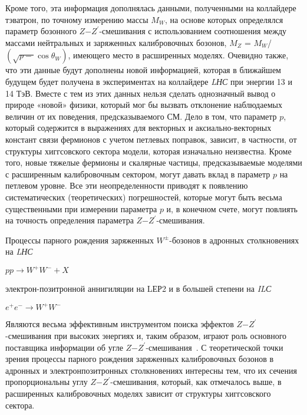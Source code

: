 Кроме того, эта информация дополнялась данными, полученными на коллайдере тэватрон, по точному измерению массы $M_W$, на основе которых определялся параметр бозонного $Z$−$Z^\prime$-смешивания с использованием соотношения между массами нейтральных и заряженных калибровочных бозонов, $M_Z$ = $M_W$/$(\sqrt{p-}\cos\theta_W)$, имеющего место в расширенных моделях. Очевидно также, что эти данные будут дополнены новой информацией, которая в ближайшем будущем будет получена в экспериментах на коллайдере \textit{LНС} при энергии 13 и 14 ТэВ. Вместе с тем из этих данных нельзя сделать однозначный вывод о природе «новой» физики, который мог бы вызвать отклонение наблюдаемых величин от их поведения, предсказываемого СМ. Дело в том, что параметр $p$, который содержится в выражениях для векторных и аксиально-векторных констант связи фермионов с учетом петлевых поправок, зависит, в частности, от структуры хиггсовского сектора модели, которая изначально неизвестна. Кроме того, новые тяжелые фермионы и скалярные частицы, предсказываемые моделями с расширенным калибровочным сектором, могут давать вклад в параметр $p$ на петлевом уровне. Все эти неопределенности приводят к появлению систематических (теоретических) погрешностей, которые могут быть весьма существенными при измерении параметра $p$ и, в конечном счете, могут повлиять на точность определения параметра $Z$−$Z^\prime$-смешивания.

Процессы парного рождения заряженных $W^±$-бозонов в адронных столкновениях на \textit{LНС}
\begin{center}
	$pp \rightarrow W^+W^- + X$
\end{center}
электрон-позитронной аннигиляции на LЕР2 и в большей степени на \textit{ILС}
\begin{center}
	$e^+e^- \rightarrow W^+W^-$
\end{center}

Являются весьма эффективным инструментом поиска эффектов $Z$−$Z^\prime$-смешивания при высоких энергиях и, таким образом, играют роль основного поставщика информации об угле $Z$−$Z^\prime$-смешивания~\cite{Bobovnikov:2016}. С теоретической точки зрения процессы парного рождения заряженных калибровочных бозонов в адронных и электронпозитронных столкновениях интересны тем, что их сечения пропорциональны углу $Z$−$Z^\prime$-смешивания, который, как отмечалось выше, в расширенных калибровочных моделях зависит от структуры хиггсовского сектора.

